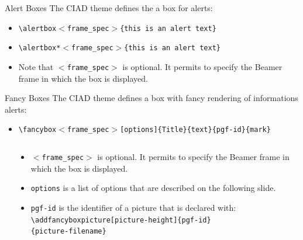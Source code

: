 \documentclass[english,sectioncirclenumberstyle]{ciadbeamer}
\begin{document}
\begin{frame}{Alert Boxes}
	The CIAD theme defines the a box for alerts: \\
	\begin{itemize}
	\item \texttt{{\textbackslash}alertbox\ensuremath{<}frame\_spec\ensuremath{>}\{this is an alert text\}} \\[.5cm]
		\vspace{1cm}
	\item \texttt{{\textbackslash}alertbox*\ensuremath{<}frame\_spec\ensuremath{>}\{this is an alert text\}} \\[.5cm]
	\item Note that \texttt{\ensuremath{<}frame\_spec\ensuremath{>}} is optional. It permits to specify the Beamer frame in which the box is displayed.
	\end{itemize}
\end{frame}

\begin{frame}{Fancy Boxes}
	The CIAD theme defines a box with fancy rendering of informations alerts: \\
	\begin{itemize}
	\item \texttt{{\textbackslash}fancybox\ensuremath{<}frame\_spec\ensuremath{>}[options]\{Title\}\{text\}\{pgf-id\}\{mark\}} \\[.5cm]
	\end{itemize}
	\begin{columns}
		\begin{column}{.3\linewidth}
		\end{column}
		\begin{column}{.7\linewidth}
			\begin{itemize}
			\item \texttt{\ensuremath{<}frame\_spec\ensuremath{>}} is optional. It permits to specify the Beamer frame in which the box is displayed.
			\item \texttt{options} is a list of options that are described on the following slide.
			\item \texttt{pgf-id} is the identifier of a picture that is declared with: \\
				\texttt{{\textbackslash}addfancyboxpicture[picture-height]\{pgf-id\}} \\
				\texttt{\{picture-filename\}}
			\end{itemize}
		\end{column}
	\end{columns}
\end{frame}
\end{document}
